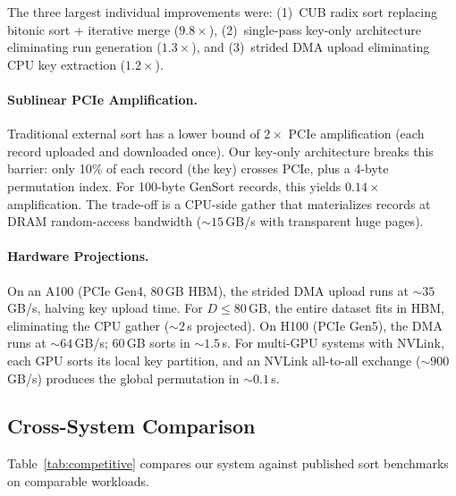 \documentclass[conference,10pt]{IEEEtran}
\begin{document}
\noindent
The three largest individual improvements were: (1)~CUB radix sort
replacing bitonic sort + iterative merge ($9.8\times$), (2)~single-pass
key-only architecture eliminating run generation ($1.3\times$), and
(3)~strided DMA upload eliminating CPU key extraction ($1.2\times$).

\paragraph{Sublinear PCIe Amplification.}
Traditional external sort has a lower bound of $2\times$ PCIe
amplification (each record uploaded and downloaded once).  Our key-only
architecture breaks this barrier: only 10\% of each record (the key)
crosses PCIe, plus a 4-byte permutation index.  For 100-byte GenSort
records, this yields $0.14\times$ amplification.  The trade-off is
a CPU-side gather that materializes records at DRAM random-access
bandwidth (${\sim}15$\,GB/s with transparent huge pages).

\paragraph{Hardware Projections.}
On an A100 (PCIe Gen4, 80\,GB HBM), the strided DMA upload runs at
${\sim}35$\,GB/s, halving key upload time.  For $D \leq 80$\,GB, the
entire dataset fits in HBM, eliminating the CPU gather (${\sim}2$\,s
projected).  On H100 (PCIe Gen5), the DMA runs at ${\sim}64$\,GB/s;
60\,GB sorts in ${\sim}1.5$\,s.  For multi-GPU systems with NVLink,
each GPU sorts its local key partition, and an NVLink all-to-all
exchange (${\sim}900$\,GB/s) produces the global permutation in
${\sim}0.1$\,s.


\subsection{Cross-System Comparison}

Table~\ref{tab:competitive} compares our system against published
sort benchmarks on comparable workloads.
\end{document}
